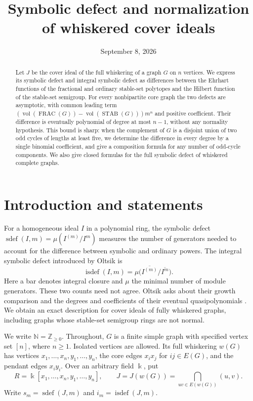 \documentclass[11pt]{article}
\title{Symbolic defect and normalization of whiskered cover ideals}
\author{}
\date{September 8, 2026}
\theoremstyle{remark}
\newcommand{\NN}{\mathbb N}
\newcommand{\ZZ}{\mathbb Z}
\newcommand{\kk}{\Bbbk}
\newcommand{\sdef}{\operatorname{sdef}}
\newcommand{\isdef}{\operatorname{isdef}}
\newcommand{\vol}{\operatorname{vol}}
\newcommand{\FRAC}{\operatorname{FRAC}}
\newcommand{\STAB}{\operatorname{STAB}}
\begin{document}
\maketitle
\begin{abstract}
Let $J$ be the cover ideal of the full whiskering of a graph $G$ on $n$
vertices. We express its symbolic defect and integral symbolic defect as
differences between the Ehrhart functions of the fractional and ordinary
stable-set polytopes and the Hilbert function of the stable-set semigroup.
For every nonbipartite core graph the two defects are asymptotic, with common
leading term $(\vol(\FRAC(G))-\vol(\STAB(G)))m^n$ and positive coefficient.
Their difference is eventually polynomial of degree at most $n-1$, without
any normality hypothesis. This bound is sharp: when the complement of $G$
is a disjoint union of two odd cycles of lengths at least five, we determine
the difference in every degree by a single binomial coefficient, and give a
composition formula for any number of odd-cycle components. We also
give closed formulas for the full symbolic defect of whiskered complete
graphs.
\end{abstract}

\section{Introduction and statements}

For a homogeneous ideal $I$ in a polynomial ring, the symbolic defect
$\sdef(I,m)=\mu(I^{(m)}/I^m)$ measures the number of generators needed to
account for the difference between symbolic and ordinary powers. The
integral symbolic defect introduced by Oltsik \cite[Definition~4.1]{Oltsik}
is
\[
\isdef(I,m)=\mu\bigl(\overline{I^{(m)}}/\overline{I^m}\bigr).
\]
Here a bar denotes integral closure and $\mu$ the minimal number of module
generators. These two counts need not agree. Oltsik asks about their growth
comparison and the degrees and coefficients of their eventual
quasipolynomials \cite[Section~7]{Oltsik}. We obtain an exact description
for cover ideals of fully whiskered graphs, including graphs whose
stable-set semigroup rings are not normal.

We write $\NN=\ZZ_{\geq0}$. Throughout, $G$ is a finite simple graph with specified vertex set $[n]$,
where $n\geq1$. Isolated vertices are allowed. Its full whiskering $w(G)$
has vertices $x_1,\ldots,x_n,y_1,\ldots,y_n$, the core edges $x_ix_j$ for
$ij\in E(G)$, and the pendant edges $x_iy_i$. Over an arbitrary field
$\kk$, put
\[
R=\kk[x_1,\ldots,x_n,y_1,\ldots,y_n],\qquad
J=J(w(G))=\bigcap_{uv\in E(w(G))}(u,v).
\]
Write $s_m=\sdef(J,m)$ and $i_m=\isdef(J,m)$.
\end{document}

